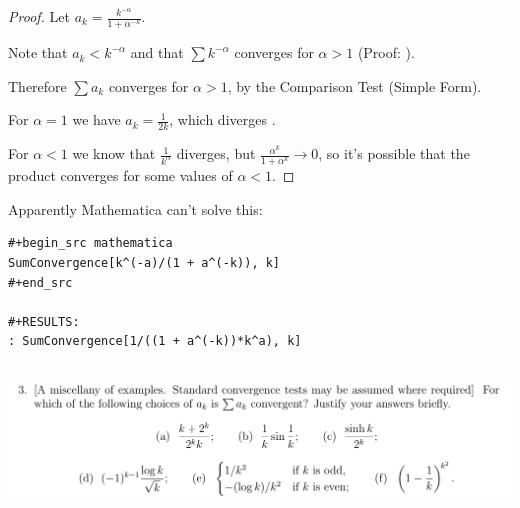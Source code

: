 \documentclass[12pt]{article}
\begin{document}
\begin{proof}
  Let $a_k = \frac{k^{-\alpha}}{1 + \alpha^{-k}}$.

  Note that $a_k < k^{-\alpha}$ and that $\sum k^{-\alpha}$ converges for $\alpha > 1$ (Proof: ).

  Therefore $\sum a_k$ converges for $\alpha > 1$, by the Comparison Test (Simple Form).

  For $\alpha=1$ we have $a_k = \frac{1}{2k}$, which diverges \red{[proof]}.

  For $\alpha < 1$ we know that $\frac{1}{k^\alpha}$ diverges, but
  $\frac{\alpha^k}{1 + \alpha^k} \to 0$, so it's possible that the product converges for some
  values of $\alpha < 1$.
\end{proof}

Apparently Mathematica can't solve this:

\begin{verbatim}
#+begin_src mathematica
SumConvergence[k^(-a)/(1 + a^(-k)), k]
#+end_src

#+RESULTS:
: SumConvergence[1/((1 + a^(-k))*k^a), k]
\end{verbatim}


\newpage
\subsection{}
\begin{mdframed}
  \includegraphics[width=400pt]{img/analysis--oxford-M2-I-6-3.png}
\end{mdframed}
\end{document}
